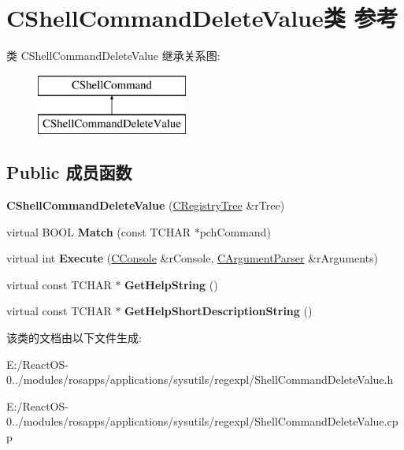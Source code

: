 \hypertarget{class_c_shell_command_delete_value}{}\section{C\+Shell\+Command\+Delete\+Value类 参考}
\label{class_c_shell_command_delete_value}
类 C\+Shell\+Command\+Delete\+Value 继承关系图\+:\begin{figure}[H]
\begin{center}
\leavevmode
\includegraphics[height=2.000000cm]{class_c_shell_command_delete_value}
\end{center}
\end{figure}
\subsection*{Public 成员函数}
\begin{DoxyCompactItemize}
\item 
\mbox{\label{class_c_shell_command_delete_value_a2e9aab2a069a528a1fff6620e788c437}} 
{\bfseries C\+Shell\+Command\+Delete\+Value} (\hyperlink{class_c_registry_tree}{C\+Registry\+Tree} \&r\+Tree)
\item 
\mbox{\label{class_c_shell_command_delete_value_acc55107daf0950e9906f2d118dc218b0}} 
virtual B\+O\+OL {\bfseries Match} (const T\+C\+H\+AR $\ast$pch\+Command)
\item 
\mbox{\label{class_c_shell_command_delete_value_a347428a596e8c2ceae6e603eb8084f02}} 
virtual int {\bfseries Execute} (\hyperlink{class_c_console}{C\+Console} \&r\+Console, \hyperlink{class_c_argument_parser}{C\+Argument\+Parser} \&r\+Arguments)
\item 
\mbox{\label{class_c_shell_command_delete_value_a1b4216971efa3e803f03d81f19bcc1d9}} 
virtual const T\+C\+H\+AR $\ast$ {\bfseries Get\+Help\+String} ()
\item 
\mbox{\label{class_c_shell_command_delete_value_a100ce7fde11fc4a806d573756be0643a}} 
virtual const T\+C\+H\+AR $\ast$ {\bfseries Get\+Help\+Short\+Description\+String} ()
\end{DoxyCompactItemize}


该类的文档由以下文件生成\+:\begin{DoxyCompactItemize}
\item 
E\+:/\+React\+O\+S-\/0../modules/rosapps/applications/sysutils/regexpl/Shell\+Command\+Delete\+Value.\+h\item 
E\+:/\+React\+O\+S-\/0../modules/rosapps/applications/sysutils/regexpl/Shell\+Command\+Delete\+Value.\+cpp\end{DoxyCompactItemize}
